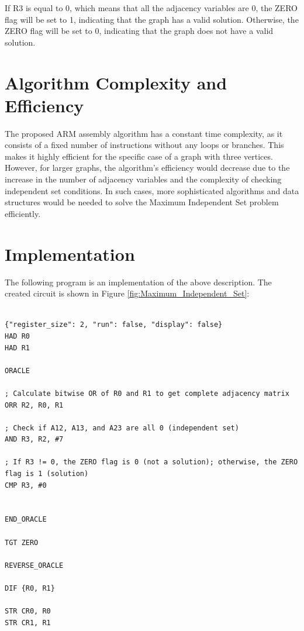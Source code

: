 If R3 is equal to 0, which means that all the adjacency variables are 0, the ZERO flag will be set to 1, indicating that the graph has a valid solution. Otherwise, the ZERO flag will be set to 0, indicating that the graph does not have a valid solution.

\section{Algorithm Complexity and Efficiency}

The proposed ARM assembly algorithm has a constant time complexity, as it consists of a fixed number of instructions without any loops or branches. This makes it highly efficient for the specific case of a graph with three vertices. However, for larger graphs, the algorithm's efficiency would decrease due to the increase in the number of adjacency variables and the complexity of checking independent set conditions. In such cases, more sophisticated algorithms and data structures would be needed to solve the Maximum Independent Set problem efficiently.



\section{Implementation}

The following program is an implementation of the above description. The created circuit is shown in Figure \ref{fig:Maximum_Independent_Set}:

\begin{lstlisting}

{"register_size": 2, "run": false, "display": false}
HAD R0
HAD R1

ORACLE

; Calculate bitwise OR of R0 and R1 to get complete adjacency matrix
ORR R2, R0, R1

; Check if A12, A13, and A23 are all 0 (independent set)
AND R3, R2, #7

; If R3 != 0, the ZERO flag is 0 (not a solution); otherwise, the ZERO flag is 1 (solution)
CMP R3, #0


END_ORACLE

TGT ZERO

REVERSE_ORACLE

DIF {R0, R1}

STR CR0, R0
STR CR1, R1


\end{lstlisting}

